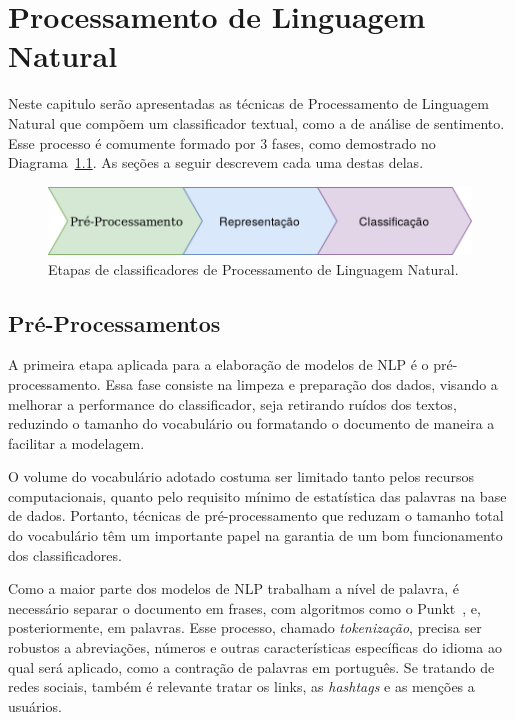 \chapter{Processamento de Linguagem Natural}
\label{chapter:nlp}

Neste capitulo serão apresentadas as técnicas de Processamento de Linguagem
Natural que compõem um classificador textual, como a de análise de sentimento.
Esse processo é comumente formado por 3 fases, como demostrado no
Diagrama~\ref{fig:nlp_diagram}.
As seções a seguir descrevem cada uma destas delas.

\begin{figure}[h]
\begin{center} {
    \begin{center}
    \includegraphics[scale=0.35]{images/nlp_diagram.png}
    \caption{Etapas de classificadores de Processamento de Linguagem Natural.}
    \label{fig:nlp_diagram}
    \end{center}
}
\end{center}
\end{figure}

\section{Pré-Processamentos}

A primeira etapa aplicada para a elaboração de modelos de NLP é o
pré-processamento.
Essa fase consiste na limpeza e preparação dos dados, visando a melhorar a
performance do classificador, seja retirando ruídos dos textos, reduzindo o
tamanho do vocabulário ou formatando o documento de maneira a facilitar a modelagem.

O volume do vocabulário adotado costuma ser limitado tanto pelos recursos
computacionais, quanto pelo requisito mínimo de estatística das palavras na base
de dados.
Portanto, técnicas de pré-processamento que reduzam o tamanho total do
vocabulário têm um importante papel na garantia de um bom funcionamento dos
classificadores.

Como a maior parte dos modelos de NLP trabalham a nível de palavra, é necessário
separar o documento em frases, com algoritmos como o Punkt~\cite{kiss06}, e,
posteriormente, em palavras.
Esse processo, chamado \textit{tokenização}, precisa ser robustos a abreviações,
números e outras características específicas do idioma ao qual será aplicado,
como a contração de palavras em português.
Se tratando de redes sociais, também é relevante tratar os links, as
\textit{hashtags} e as menções a usuários.

